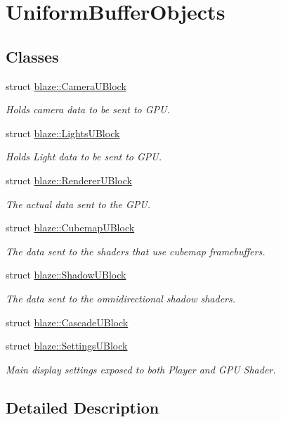 \hypertarget{group__UniformBufferObjects}{}\section{Uniform\+Buffer\+Objects}
\label{group__UniformBufferObjects}
\subsection*{Classes}
\begin{DoxyCompactItemize}
\item 
struct \hyperlink{structblaze_1_1CameraUBlock}{blaze\+::\+Camera\+U\+Block}
\begin{DoxyCompactList}\small\item\em Holds camera data to be sent to G\+PU. \end{DoxyCompactList}\item 
struct \hyperlink{structblaze_1_1LightsUBlock}{blaze\+::\+Lights\+U\+Block}
\begin{DoxyCompactList}\small\item\em Holds Light data to be sent to G\+PU. \end{DoxyCompactList}\item 
struct \hyperlink{structblaze_1_1RendererUBlock}{blaze\+::\+Renderer\+U\+Block}
\begin{DoxyCompactList}\small\item\em The actual data sent to the G\+PU. \end{DoxyCompactList}\item 
struct \hyperlink{structblaze_1_1CubemapUBlock}{blaze\+::\+Cubemap\+U\+Block}
\begin{DoxyCompactList}\small\item\em The data sent to the shaders that use cubemap framebuffers. \end{DoxyCompactList}\item 
struct \hyperlink{structblaze_1_1ShadowUBlock}{blaze\+::\+Shadow\+U\+Block}
\begin{DoxyCompactList}\small\item\em The data sent to the omnidirectional shadow shaders. \end{DoxyCompactList}\item 
struct \hyperlink{structblaze_1_1CascadeUBlock}{blaze\+::\+Cascade\+U\+Block}
\item 
struct \hyperlink{structblaze_1_1SettingsUBlock}{blaze\+::\+Settings\+U\+Block}
\begin{DoxyCompactList}\small\item\em Main display settings exposed to both Player and G\+PU Shader. \end{DoxyCompactList}\end{DoxyCompactItemize}


\subsection{Detailed Description}
